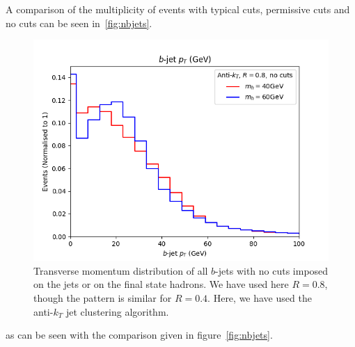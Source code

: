 A comparison of the  multiplicity of events with
typical cuts, permissive cuts and no cuts can be seen in~\ref{fig:nbjets}.
\begin{figure}[htb!]
	\centering
	\includegraphics[scale=0.6]{plots/bjetpt_AK8_nocuts.png}
	\caption{Transverse momentum distribution of all $b$-jets with no cuts imposed on the jets or on the final state hadrons. We have used here $R=0.8$, though the pattern is similar for $R=0.4$. Here, we have used the anti-$k_T$ jet clustering algorithm.}
\label{fig:bjetpt}
\end{figure}
as can be seen with the comparison given in figure~\ref{fig:nbjets}.
